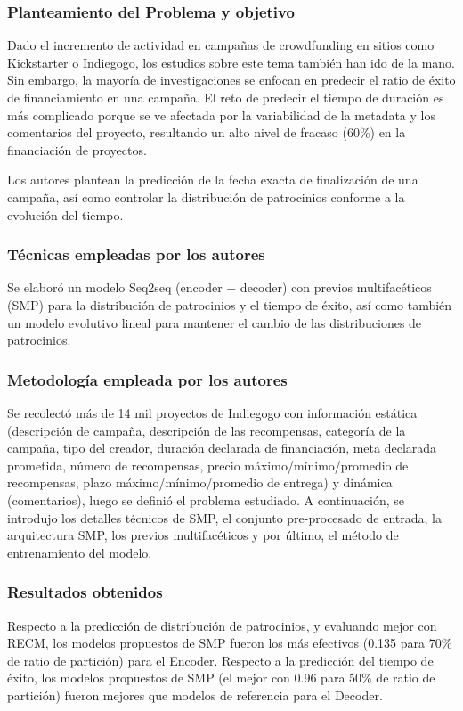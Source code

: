 \subsubsection{Planteamiento del Problema y objetivo}
Dado el incremento de actividad en campañas de crowdfunding en sitios como Kickstarter o Indiegogo, los estudios sobre este tema también han ido de la mano. Sin embargo, la mayoría de investigaciones se enfocan en predecir el ratio de éxito de financiamiento en una campaña. El reto de predecir el tiempo de duración es más complicado porque se ve afectada por la variabilidad de la metadata y los comentarios del proyecto, resultando un alto nivel de fracaso (60\%) en la financiación de proyectos.

Los autores plantean la predicción de la fecha exacta de finalización de una campaña, así como controlar la distribución de patrocinios conforme a la evolución del tiempo.

\subsubsection{Técnicas empleadas por los autores}
Se elaboró un modelo Seq2seq (encoder + decoder) con previos multifacéticos (SMP) para la distribución de patrocinios y el tiempo de éxito, así como también un modelo evolutivo lineal para mantener el cambio de las distribuciones de patrocinios.

\subsubsection{Metodología empleada por los autores}
Se recolectó más de 14 mil proyectos de Indiegogo con información estática (descripción de campaña, descripción de las recompensas, categoría de la campaña, tipo del creador, duración declarada de financiación, meta declarada prometida, número de recompensas, precio máximo/mínimo/promedio de recompensas, plazo máximo/mínimo/promedio de entrega) y dinámica (comentarios), luego se definió el problema estudiado. A continuación, se introdujo los detalles técnicos de SMP, el conjunto pre-procesado de entrada, la arquitectura SMP, los previos multifacéticos y por último, el método de entrenamiento del modelo.

\subsubsection{Resultados obtenidos}
Respecto a la predicción de distribución de patrocinios, y evaluando mejor con RECM, los modelos propuestos de SMP fueron los más efectivos (0.135 para 70\% de ratio de partición) para el Encoder.
Respecto a la predicción del tiempo de éxito, los modelos propuestos de SMP (el mejor con 0.96 para 50\% de ratio de partición) fueron mejores que modelos de referencia para el Decoder.

